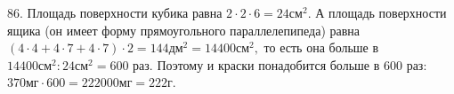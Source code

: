 86. Площадь поверхности кубика равна $2\cdot2\cdot6=24\text{см}^2.$ А площадь поверхности ящика (он имеет форму прямоугольного параллелепипеда) равна $(4\cdot4+4\cdot7+4\cdot7)\cdot2=144\text{дм}^2=14400\text{см}^2,$ то есть она больше в $14400\text{см}^2:24\text{см}^2=600$ раз. Поэтому и краски понадобится больше в 600 раз: $370\text{мг}\cdot600=222000\text{мг}=222$г.\\
